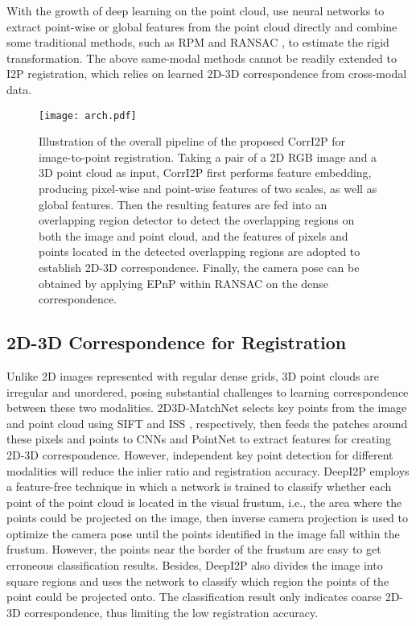 \documentclass[lettersize,journal]{IEEEtran}
\begin{document}
With the growth of deep learning on the point cloud, \cite{DEEPICP,DCP,RPMNET,3DMATCH,D3FEAT,POINTNETLK,PCRNET,PERFECTMATCH,PREDATOR} use neural networks to extract point-wise or global features from the point cloud directly and combine some traditional methods, such as RPM \cite{RPM} and RANSAC \cite{RANSAC}, to estimate the rigid transformation. The above same-modal methods cannot be readily extended to I2P registration, which relies on learned 2D-3D correspondence from cross-modal data.

\begin{figure*}[t]
\centering
\texttt{[image: arch.pdf]}
\caption{Illustration of the overall pipeline of the proposed CorrI2P for image-to-point registration. Taking a pair of a 2D RGB image and a 3D point cloud as input, CorrI2P first performs feature embedding, producing pixel-wise and point-wise features of two scales, as well as global features. Then the resulting features are fed into an overlapping region detector to detect the overlapping regions on both the image and point cloud, and the features of pixels and points located in the detected overlapping regions are adopted to 
establish 2D-3D correspondence. Finally, the camera pose can be obtained by applying EPnP within RANSAC on the dense correspondence.}
\label{FIG2}
\end{figure*}

\subsection{2D-3D Correspondence for Registration}
Unlike 2D images represented with regular dense grids, 3D point clouds are irregular and unordered,  posing substantial challenges to learning correspondence between these two modalities. 2D3D-MatchNet \cite{2D3DMATCHNET} selects key points from the image and point cloud using SIFT \cite{SIFT} and ISS \cite{ISS}, respectively, then feeds the patches around these pixels and points to CNNs \cite{VGG} and PointNet \cite{POINTNET} to extract features for creating 2D-3D correspondence. However, independent key point detection for different modalities will reduce the inlier ratio and registration accuracy. DeepI2P \cite{DEEPI2P} employs a feature-free technique in which a network is trained to classify whether each point of the point cloud is located in the visual frustum, i.e., the area where the points could be projected on the image, then inverse camera projection is used to optimize the camera pose until the points identified in the image fall within the frustum. 
However, the points near the border of the frustum are easy to get erroneous classification results. Besides, DeepI2P also divides the image into square regions and uses the network to classify which region the points of the point could be projected onto. The classification result only indicates coarse 2D-3D correspondence, thus limiting the low registration accuracy. 
\end{document}
